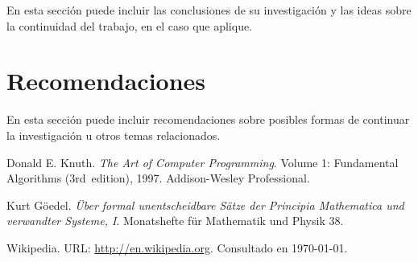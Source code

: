 \documentclass[a4paper,10pt,twocolumn]{article}
\begin{document}
  En esta sección puede incluir las conclusiones de su investigación y las ideas
  sobre la continuidad del trabajo, en el caso que aplique.




\section{Recomendaciones}\label{sec:rec}

  En esta sección puede incluir recomendaciones sobre posibles formas de continuar
  la investigación u otros temas relacionados.




\begin{thebibliography}{99}
	 Donald E. Knuth. \emph{The Art of Computer Programming}.
		Volume 1: Fundamental Algorithms (3rd~edition), 1997.
		Addison-Wesley Professional.

	 Kurt Göedel. \emph{Über formal unentscheidbare Sätze der
		Principia Mathematica und verwandter Systeme, I}.
		Monatshefte für Mathematik und Physik 38.

	 Wikipedia. URL: \href{http://en.wikipedia.org}
	  {http://en.wikipedia.org}.
		Consultado en \today.

\end{thebibliography}


\label{end}
\end{document}
